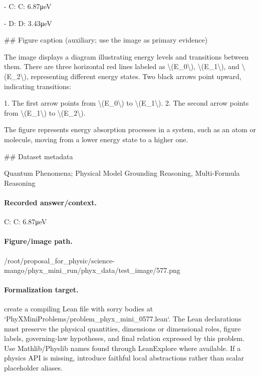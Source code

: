 - C: C: 6.87μeV

- D: D: 3.43μeV

\#\# Figure caption (auxiliary; use the image as primary evidence)

The image displays a diagram illustrating energy levels and transitions between them. There are three horizontal red lines labeled as \textbackslash{}(E\_0\textbackslash{}), \textbackslash{}(E\_1\textbackslash{}), and \textbackslash{}(E\_2\textbackslash{}), representing different energy states. Two black arrows point upward, indicating transitions:

1. The first arrow points from \textbackslash{}(E\_0\textbackslash{}) to \textbackslash{}(E\_1\textbackslash{}).
2. The second arrow points from \textbackslash{}(E\_1\textbackslash{}) to \textbackslash{}(E\_2\textbackslash{}).

The figure represents energy absorption processes in a system, such as an atom or molecule, moving from a lower energy state to a higher one.

\#\# Dataset metadata

Quantum Phenomena; Physical Model Grounding Reasoning, Multi-Formula Reasoning

\paragraph{Recorded answer/context.}
C: C: 6.87μeV

\paragraph{Figure/image path.}
/root/proposal\_for\_physic/science-mango/phyx\_mini\_run/phyx\_data/test\_image/577.png

\paragraph{Formalization target.}
create a compiling Lean file with sorry bodies at `PhyXMiniProblems/problem\_phyx\_mini\_0577.lean`. The Lean declarations must preserve the physical quantities, dimensions or dimensional roles, figure labels, governing-law hypotheses, and final relation expressed by this problem.
Use Mathlib/Physlib names found through LeanExplore where available. If a physics API is missing, introduce faithful local abstractions rather than scalar placeholder aliases.

